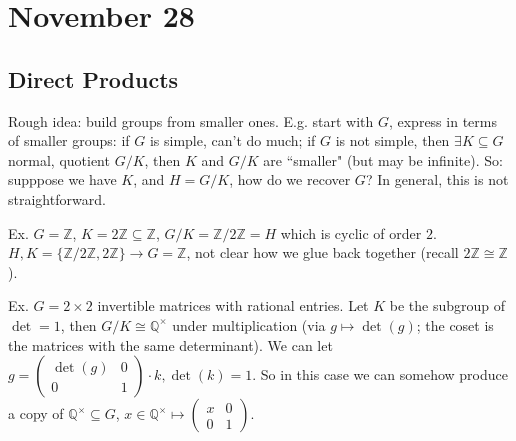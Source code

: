 \documentclass{article}
\theoremstyle{plain}
\theoremstyle{remark}
\newcommand{\Z}{{\mathbb Z}}
\newcommand{\Q}{{\mathbb Q}}
\begin{document}
\section{November 28}
\subsection{Direct Products}
Rough idea: build groups from smaller ones.
E.g. start with $G$, express in terms of smaller groups:
if $G$ is simple, can't do much;
if $G$ is not simple, then $\exists K \subseteq G$ normal, quotient $G/K$,
then $K$ and $G/K$ are ``smaller" (but may be infinite).
So: supppose we have $K$, and $H = G/K$, how do we recover $G$?
In general, this is not straightforward.

Ex. $G = \Z$, $K = 2\Z \subseteq \Z$, $G/K = \Z/2\Z = H$ which is cyclic of order $2$.
$H,K = \{\Z/2\Z, 2\Z\} \to G = \Z$, not clear how we glue back together
(recall $2\Z \cong \Z$).

Ex. $G = 2\times 2$ invertible matrices with rational entries.
Let $K$ be the subgroup of $\det = 1$,
then $G/K \cong \Q^\times$ under multiplication
(via $g \mapsto \det(g)$; the coset is the matrices with the same determinant).
We can let $g = \begin{pmatrix} \det(g) & 0 \\ 0 & 1\end{pmatrix}\cdot k,
\det(k) = 1$.
So in this case we can somehow produce a copy of $\Q^\times \subseteq G$,
$x \in \Q^\times \mapsto \begin{pmatrix} x &0 \\0 & 1\end{pmatrix}$.
\end{document}
